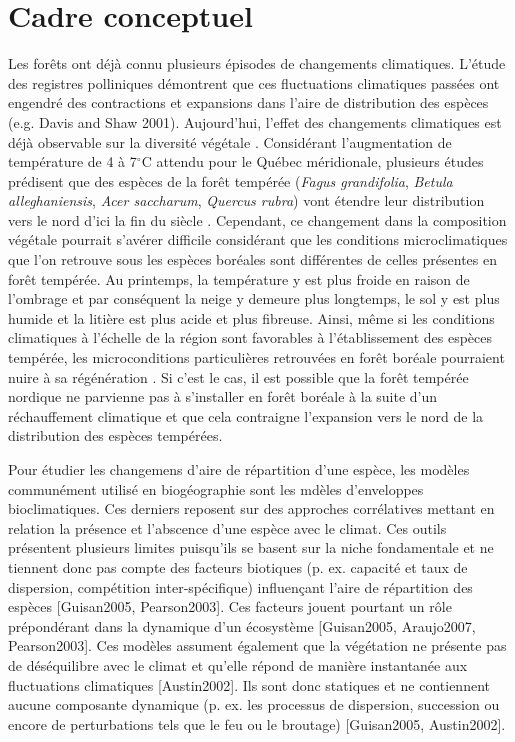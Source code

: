 \section*{Cadre conceptuel}

Les forêts ont déjà connu plusieurs épisodes de changements climatiques. L'étude des registres
polliniques démontrent que ces fluctuations climatiques passées ont engendré des contractions et
expansions dans l'aire de distribution des espèces (e.g. Davis and Shaw 2001). Aujourd'hui, l'effet
des changements climatiques est déjà observable sur la diversité végétale
\citep{Walther2002a,Parmesan2006}. Considérant l'augmentation de température de 4 à 7$^\circ$C
\citep[Scénario RCP 8.5]{Climatique2015} attendu pour le Québec méridionale, plusieurs études
prédisent que des espèces de la forêt tempérée (\textit{Fagus grandifolia}, \textit{Betula
alleghaniensis}, \textit{Acer saccharum}, \textit{Quercus rubra}) vont étendre leur distribution
vers le nord d'ici la fin du siècle \citep{Iverson2002,Sciences2014}. Cependant, ce changement dans
la composition végétale pourrait s'avérer difficile considérant que les conditions microclimatiques
que l’on retrouve sous les espèces boréales sont différentes de celles présentes en forêt tempérée.
Au printemps, la température y est plus froide en raison de l'ombrage et par conséquent la neige y
demeure plus longtemps, le sol y est plus humide et la litière est plus acide et plus fibreuse.
Ainsi, même si les conditions climatiques à l'échelle de la région sont favorables à l'établissement
des espèces tempérée, les microconditions particulières retrouvées en forêt boréale pourraient nuire à
sa régénération \citep{DeFrenne2013,Lafleur2010}. Si c’est le cas, il est possible que la forêt
tempérée nordique ne parvienne pas à s'installer en forêt boréale à la suite d’un réchauffement
climatique et que cela contraigne l'expansion vers le nord de la distribution des espèces tempérées.

Pour étudier les changemens d'aire de répartition d'une espèce, les modèles communément utilisé en
biogéographie sont les mdèles d'enveloppes bioclimatiques. Ces derniers reposent sur des approches
corrélatives mettant en relation la présence et l'abscence d'une espèce avec le climat. Ces outils
présentent plusieurs limites puisqu'ils se basent sur la niche fondamentale et ne tiennent donc pas
compte des facteurs biotiques (p. ex. capacité et taux de dispersion, compétition inter-spécifique)
influençant l'aire de répartition des espèces [Guisan2005, Pearson2003]. Ces facteurs jouent
pourtant un rôle prépondérant dans la dynamique d’un écosystème [Guisan2005, Araujo2007,
Pearson2003]. Ces modèles assument également que la végétation ne présente pas de déséquilibre avec
le climat et qu'elle répond de manière instantanée aux fluctuations climatiques [Austin2002]. Ils
sont donc statiques et ne contiennent aucune composante dynamique (p. ex. les processus de
dispersion, succession ou encore de perturbations tels que le feu ou le broutage) [Guisan2005,
Austin2002].

